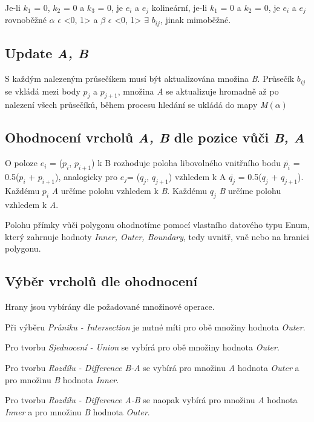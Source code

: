 \documentclass[11pt]{article}
\begin{document}
Je-li $ k_1 $ = 0, $ k_2 $ = 0 a $ k_3 $ = 0, je $ e_i $ a $ e_j $ kolineární,
je-li $ k_1 $ = 0 a $ k_2 $ = 0, je $ e_i $ a $ e_j $ rovnoběžné
$ \alpha $ $ \epsilon $ <0, 1> a $ \beta $ $ \epsilon $ <0, 1> $ \exists $ $ b_{ij} $, jinak mimoběžné.

\subsection{Update\textit{ A, B}}
S každým nalezeným průsečíkem musí být aktualizována množina \textit{B}. Průsečík $ b_{ij} $ se vkládá mezi body $ p_j $ a $ p_{j+1} $, množina \textit{A} se aktualizuje hromadně až po nalezení všech průsečíků, během procesu hledání se ukládá do mapy \textit{M$ (\alpha) $}

\subsection{Ohodnocení vrcholů \textit{ A, B} dle pozice vůči \textit{B, A}}
O poloze $ e_i $ = ($ p_i $, $ p_{i+1} $) k B rozhoduje poloha libovolného vnitřního bodu
$ \overline{p_i} $ = 0.5($ p_i $ + $ p_{i+1} $),
analogicky pro $ e_j $= ($ q_j $, $ q_{j+1} $) vzhledem k A
$ \overline{q_j} $ = 0.5($ q_j $ + $ q_{j+1} $).
Každému $ p_i $  \textit{A} určíme polohu vzhledem k \textit{B}.
Každému $ q_j $ \textit{B} určíme polohu vzhledem k \textit{A}.


Polohu přímky vůči polygonu ohodnotíme pomocí vlastního datového typu Enum, který zahrnuje hodnoty \textit{Inner, Outer, Boundary}, tedy uvnitř, vně nebo na hranici polygonu.

\subsection{Výběr vrcholů dle ohodnocení}
Hrany jsou vybírány dle požadované množinové operace.
 
Při výběru \textit{Průniku - Intersection} je nutné míti pro obě množiny hodnota \textit{Outer}.

Pro tvorbu \textit{Sjednocení - Union} se vybírá pro obě množiny hodnota \textit{Outer}.

Pro tvorbu \textit{Rozdílu - Difference B-A} se vybírá pro množinu \textit{A} hodnota \textit{Outer} a pro množinu \textit{B} hodnota \textit{Inner}.

Pro tvorbu \textit{Rozdílu - Difference A-B} se naopak vybírá pro množinu \textit{A} hodnota \textit{Inner} a pro množinu \textit{B} hodnota \textit{Outer}.
\end{document}
